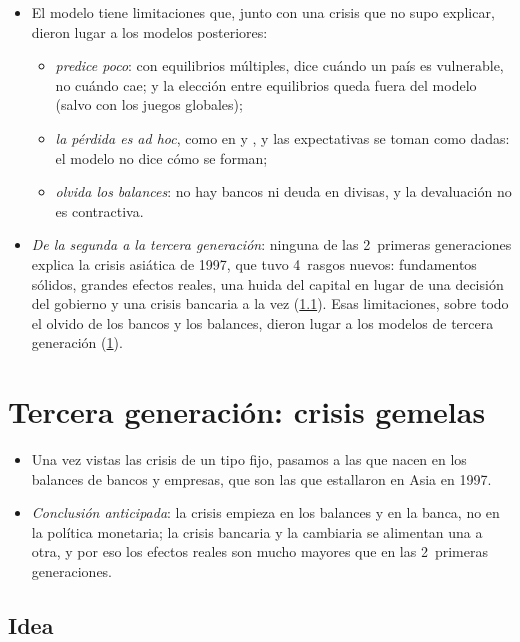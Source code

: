 \documentclass[11pt]{article}
\begin{document}
\begin{itemize}
\item El modelo tiene limitaciones que, junto con una crisis que no supo explicar, dieron lugar a los modelos posteriores:
  \begin{itemize}
  \item \emph{predice poco}: con equilibrios múltiples, dice cuándo un país es vulnerable, no cuándo cae; y la elección entre equilibrios queda fuera del modelo (salvo con los juegos globales);
  \item \emph{la pérdida es ad hoc}, como en  y  , y las expectativas se toman como dadas: el modelo no dice cómo se forman;
  \item \emph{olvida los balances}: no hay bancos ni deuda en divisas, y la devaluación no es contractiva.
  \end{itemize}
\item \emph{De la segunda a la tercera generación}: ninguna de las 2~primeras generaciones explica la crisis asiática de 1997, que tuvo 4~rasgos nuevos: fundamentos sólidos, grandes efectos reales, una huida del capital en lugar de una decisión del gobierno y una crisis bancaria a la vez (\ref{sec:tercera-idea}). Esas limitaciones, sobre todo el olvido de los bancos y los balances, dieron lugar a los modelos de tercera generación (\ref{sec:tercera}).
\end{itemize}

\section{Tercera generación: crisis gemelas}\label{sec:tercera}

\begin{itemize}
\item Una vez vistas las crisis de un tipo fijo, pasamos a las que nacen en los balances de bancos y empresas, que son las que estallaron en Asia en 1997.
\item \emph{Conclusión anticipada}: la crisis empieza en los balances y en la banca, no en la política monetaria; la crisis bancaria y la cambiaria se alimentan una a otra, y por eso los efectos reales son mucho mayores que en las 2~primeras generaciones.
\end{itemize}

\subsection{Idea}\label{sec:tercera-idea}
\end{document}
